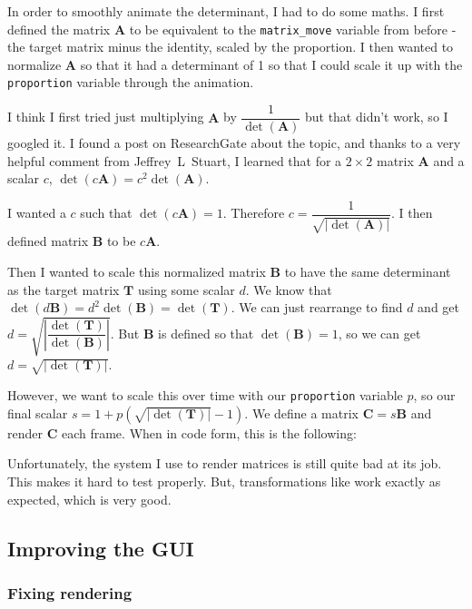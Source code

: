 \documentclass[../main.tex]{subfiles}
\begin{document}
In order to smoothly animate the determinant, I had to do some maths. I first defined the matrix $\mathbf{A}$ to be equivalent to the \texttt{matrix\_move} variable from before - the target matrix minus the identity, scaled by the proportion. I then wanted to normalize $\mathbf{A}$ so that it had a determinant of 1 so that I could scale it up with the \texttt{proportion} variable through the animation.

I think I first tried just multiplying $\mathbf{A}$ by $\dfrac{1}{\det(\mathbf{A})}$ but that didn't work, so I googled it. I found a post\cite{researchgate-normalize-determinant} on ResearchGate about the topic, and thanks to a very helpful comment from Jeffrey~L~Stuart, I learned that for a $2 \times 2$ matrix $\mathbf{A}$ and a scalar $c$, $\det(c \mathbf{A}) = c^2 \det(\mathbf{A})$.

I wanted a $c$ such that $\det(c \mathbf{A}) = 1$. Therefore $c = \dfrac{1}{\sqrt{|\det(\mathbf{A})|}}$. I then defined matrix $\mathbf{B}$ to be $c\mathbf{A}$.

Then I wanted to scale this normalized matrix $\mathbf{B}$ to have the same determinant as the target matrix $\mathbf{T}$ using some scalar $d$. We know that $\det(d \mathbf{B}) = d^2 \det(\mathbf{B}) = \det(\mathbf{T})$. We can just rearrange to find $d$ and get $d = \sqrt{\left|\dfrac{\det(\mathbf{T})}{\det(\mathbf{B})}\right|}$. But $\mathbf{B}$ is defined so that $\det(\mathbf{B}) = 1$, so we can get $d = \sqrt{|\det(\mathbf{T})|}$.

However, we want to scale this over time with our \texttt{proportion} variable $p$, so our final scalar $s = 1 + p \left(\sqrt{|\det(\mathbf{T})|} - 1\right)$. We define a matrix $\mathbf{C} = s \mathbf{B}$ and render $\mathbf{C}$ each frame. When in code form, this is the following:


Unfortunately, the system I use to render matrices is still quite bad at its job. This makes it hard to test properly. But, transformations like  work exactly as expected, which is very good.

\subsection{Improving the GUI\label{development:improving-the-gui}}

\subsubsection{Fixing rendering\label{development:improving-the-gui:fixing-rendering}}
\end{document}
